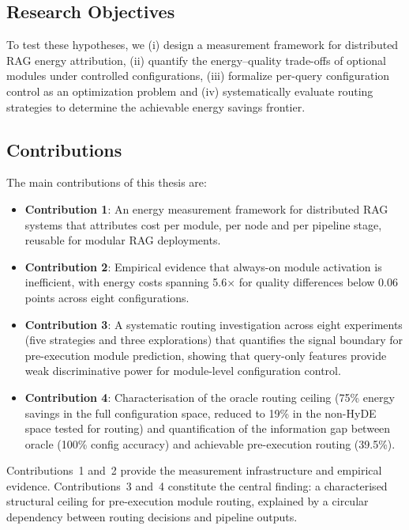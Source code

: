 \subsection{Research Objectives}

To test these hypotheses, we
(i) design a measurement framework for distributed RAG energy attribution,
(ii) quantify the energy--quality trade-offs of optional modules under
controlled configurations,
(iii) formalize per-query configuration control as an optimization problem
and (iv) systematically evaluate routing strategies to determine the
achievable energy savings frontier.

\subsection{Contributions}

The main contributions of this thesis are:

\begin{itemize}
    \item \textbf{Contribution 1}: An energy measurement framework for distributed RAG
          systems that attributes cost per module, per node and per pipeline
          stage, reusable for modular RAG deployments.

    \item \textbf{Contribution 2}: Empirical evidence that always-on module activation is
          inefficient, with energy costs spanning 5.6$\times$ for quality
          differences below 0.06 points across eight configurations.

    \item \textbf{Contribution 3}: A systematic routing investigation across eight
          experiments (five strategies and three explorations) that
          quantifies the signal boundary for pre-execution module
          prediction, showing that query-only features provide weak
          discriminative power for module-level configuration control.

    \item \textbf{Contribution 4}: Characterisation of the oracle routing ceiling (75\%
          energy savings in the full configuration space, reduced to 19\%
          in the non-HyDE space tested for routing) and quantification of
          the information gap between oracle (100\% config accuracy) and
          achievable pre-execution routing (39.5\%).
\end{itemize}

Contributions~1 and~2 provide the measurement infrastructure and empirical
evidence.  Contributions~3 and~4 constitute the central finding: a
characterised structural ceiling for pre-execution module routing, explained
by a circular dependency between routing decisions and pipeline outputs.

